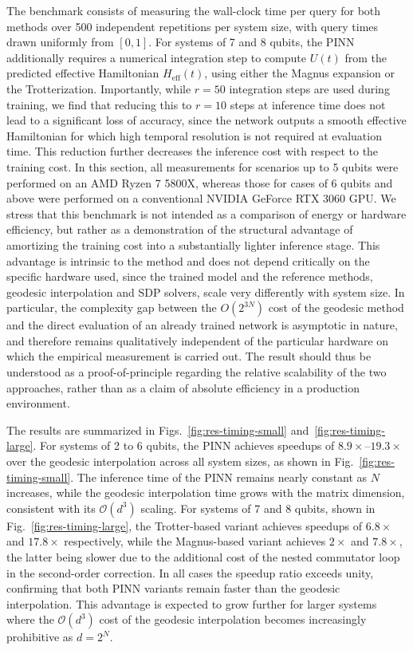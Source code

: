 The benchmark consists of measuring the wall-clock time per query for both methods over 500 independent repetitions per system size, with query times drawn uniformly from $[0, 1]$. For systems of 7 and 8 qubits, the PINN additionally requires a numerical integration step to compute $U(t)$ from the predicted effective Hamiltonian $H_\mathrm{eff}(t)$, using either the Magnus expansion or the Trotterization. Importantly, while $r = 50$ integration steps are used during training, we find that reducing this to $r = 10$ steps at inference time does not lead to a significant loss of accuracy, since the network outputs a smooth effective Hamiltonian for which high temporal resolution is not required at evaluation time. This reduction further decreases the inference cost with respect to the training cost. In this section, all measurements for scenarios up to 5 qubits were performed on an AMD Ryzen 7 5800X, whereas those for cases of 6 qubits and above were performed on a conventional NVIDIA GeForce RTX 3060 GPU. We stress that this benchmark is not intended as a comparison of energy or hardware efficiency, but rather as a demonstration of the structural advantage of amortizing the training cost into a substantially lighter inference stage. This advantage is intrinsic to the method and does not depend critically on the specific hardware used, since the trained model and the reference methods, geodesic interpolation and SDP solvers, scale very differently with system size. In particular, the complexity gap between the $O(2^{3N})$ cost of the geodesic method and the direct evaluation of an already trained network is asymptotic in nature, and therefore remains qualitatively independent of the particular hardware on which the empirical measurement is carried out. The result should thus be understood as a proof-of-principle regarding the relative scalability of the two approaches, rather than as a claim of absolute efficiency in a production environment.

The results are summarized in Figs.~\ref{fig:res-timing-small} and~\ref{fig:res-timing-large}. For systems of 2 to 6 qubits, the PINN achieves speedups of $8.9\times$--$19.3\times$ over the geodesic interpolation across all system sizes, as shown in Fig.~\ref{fig:res-timing-small}. The inference time of the PINN remains nearly constant as $N$ increases, while the geodesic interpolation time grows with the matrix dimension, consistent with its $\mathcal{O}(d^3)$ scaling. For systems of 7 and 8 qubits, shown in Fig.~\ref{fig:res-timing-large}, the Trotter-based variant achieves speedups of $6.8\times$ and $17.8\times$ respectively, while the Magnus-based variant achieves $2\times$ and $7.8\times$, the latter being slower due to the additional cost of the nested commutator loop in the second-order correction. In all cases the speedup ratio exceeds unity, confirming that both PINN variants remain faster than the geodesic interpolation. This advantage is expected to grow further for larger systems where the $\mathcal{O}(d^3)$ cost of the geodesic interpolation becomes increasingly prohibitive as $d = 2^N$.

